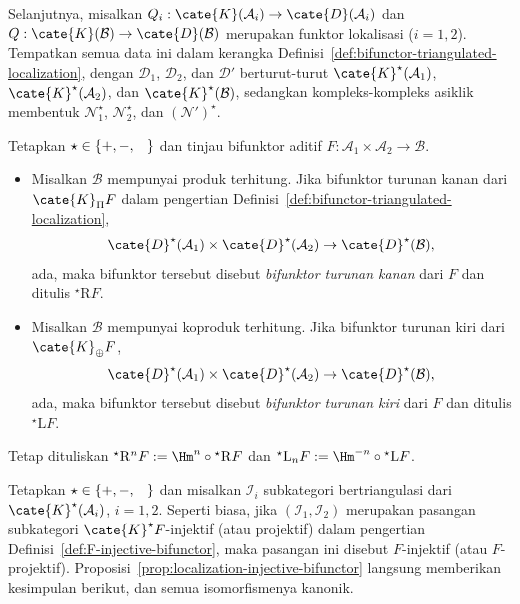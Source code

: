 Selanjutnya, misalkan
$Q_i:\cate{K}(\mathcal{A}_i)\to\cate{D}(\mathcal{A}_i)$ dan
$Q:\cate{K}(\mathcal{B})\to\cate{D}(\mathcal{B})$ merupakan funktor
lokalisasi ($i=1,2$). Tempatkan semua data ini dalam kerangka
Definisi~\ref{def:bifunctor-triangulated-localization}, dengan
$\mathcal{D}_1$, $\mathcal{D}_2$, dan $\mathcal{D}'$ berturut-turut
$\cate{K}^\star(\mathcal{A}_1)$, $\cate{K}^\star(\mathcal{A}_2)$, dan
$\cate{K}^\star(\mathcal{B})$, sedangkan kompleks-kompleks asiklik membentuk
$\mathcal{N}_1^\star$, $\mathcal{N}_2^\star$, dan $(\mathcal{N}')^\star$.

\begin{definisi}\label{def:derived-bifunctor}
	 
	Tetapkan $\star\in\{+,-,\hspace{0.8em}\}$ dan tinjau bifunktor aditif
	$F:\mathcal{A}_1\times\mathcal{A}_2\to\mathcal{B}$.
	\begin{itemize}
		\item Misalkan $\mathcal{B}$ mempunyai produk terhitung. Jika bifunktor
		turunan kanan dari $\cate{K}_{\Pi}F$ dalam pengertian
		Definisi~\ref{def:bifunctor-triangulated-localization},
		\[\cate{D}^\star(\mathcal{A}_1)\times\cate{D}^\star(\mathcal{A}_2)
		\to\cate{D}^\star(\mathcal{B}),\]
		ada, maka bifunktor tersebut disebut \emph{bifunktor turunan kanan} dari
		$F$ dan ditulis ${}^\star\mathrm{R}F$.
		\item Misalkan $\mathcal{B}$ mempunyai koproduk terhitung. Jika bifunktor
		turunan kiri dari $\cate{K}_{\oplus}F$,
		\[\cate{D}^\star(\mathcal{A}_1)\times\cate{D}^\star(\mathcal{A}_2)
		\to\cate{D}^\star(\mathcal{B}),\]
		ada, maka bifunktor tersebut disebut \emph{bifunktor turunan kiri} dari
		$F$ dan ditulis ${}^\star\mathrm{L}F$.
	\end{itemize}
	Tetap dituliskan
	${}^\star\mathrm{R}^nF:=\Hm^n\circ{}^\star\mathrm{R}F$ dan
	${}^\star\mathrm{L}_nF:=\Hm^{-n}\circ{}^\star\mathrm{L}F$.
\end{definisi}

Tetapkan $\star\in\{+,-,\hspace{0.8em}\}$ dan misalkan $\mathcal{I}_i$
subkategori bertriangulasi dari $\cate{K}^\star(\mathcal{A}_i)$, $i=1,2$.
Seperti biasa, jika $(\mathcal{I}_1,\mathcal{I}_2)$ merupakan pasangan
subkategori $\cate{K}^\star F$-injektif (atau projektif) dalam pengertian
Definisi~\ref{def:F-injective-bifunctor}, maka pasangan ini disebut
$F$-injektif (atau $F$-projektif). Proposisi~\ref{prop:localization-injective-bifunctor}
langsung memberikan kesimpulan berikut, dan semua isomorfismenya kanonik.
 

